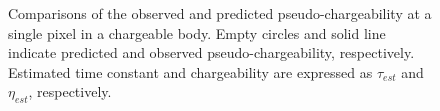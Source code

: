 \documentclass[extra,mreferee]{gji}
\begin{document}
\begin{figure}
  \caption{Comparisons of the observed and predicted pseudo-chargeability at a single pixel in a chargeable body. 
  Empty circles and solid line indicate predicted and observed pseudo-chargeability, respectively. Estimated time constant and chargeability are expressed as $\tau_{est}$ and $\eta_{est}$, respectively.}
  \label{F:IntrinsicIP}
\end{figure}

\clearpage
\appendix
\end{document}
